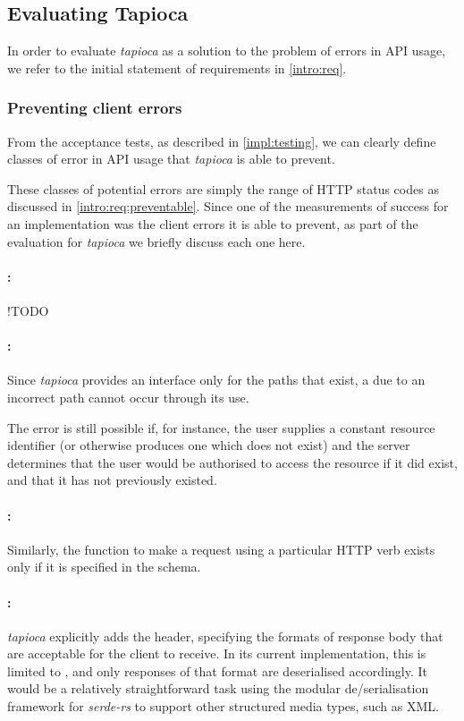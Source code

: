 \subsection{Evaluating Tapioca} \label{concl:eval}

In order to evaluate \emph{tapioca} as a solution to the problem of errors in API usage, we refer to the initial statement of requirements in \ref{intro:req}.

\subsubsection{Preventing client errors} \label{concl:eval:prevent}

From the acceptance tests, as described in \cref{impl:testing}, we can clearly define classes of error in API usage that \emph{tapioca} is able to prevent.

These classes of potential errors are simply the  range of HTTP status codes as discussed in \cref{intro:req:preventable}. Since one of the measurements of success for an implementation was the client errors it is able to prevent, as part of the evaluation for \emph{tapioca} we briefly discuss each one here. 

\paragraph{:} !TODO

\paragraph{:} Since \emph{tapioca} provides an interface only for the paths that exist, a  due to an incorrect path cannot occur through its use.

The error is still possible if, for instance, the user supplies a constant resource identifier (or otherwise produces one which does not exist) and the server determines that the user would be authorised to access the resource if it did exist, and that it has not previously existed.

\paragraph{:} Similarly, the function to make a request using a particular HTTP verb exists only if it is specified in the schema.

\paragraph{:} \emph{tapioca} explicitly adds the  header, specifying the formats of response body that are acceptable for the client to receive. In its current implementation, this is limited to , and only responses of that format are deserialised accordingly. It would be a relatively straightforward task using the modular de/serialisation framework for \emph{serde-rs} to support other structured media types, such as XML.


